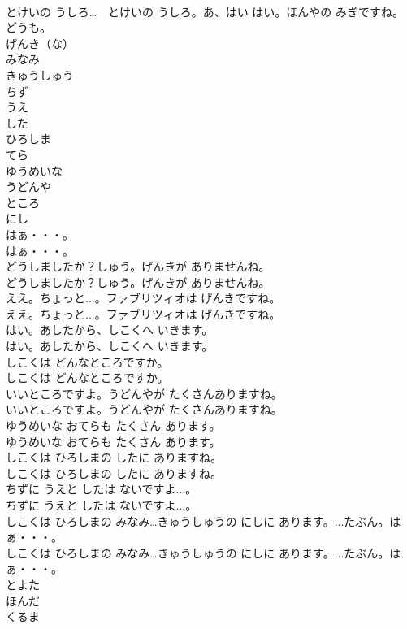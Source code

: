 \documentclass[8pt]{extreport}
\begin{document}
\begin{CJK}{UTF8}{min}
\\	とけいの うしろ…　とけいの うしろ。あ、はい はい。ほんやの みぎですね。どうも。 
\\	げんき（な）
\\	みなみ
\\	きゅうしゅう
\\	ちず
\\	うえ
\\	した
\\	ひろしま
\\	てら
\\	ゆうめいな
\\	うどんや
\\	ところ
\\	にし
\\	はぁ・・・。	
\\	はぁ・・・。 
\\	どうしましたか？しゅう。げんきが ありませんね。	
\\	どうしましたか？しゅう。げんきが ありませんね。 
\\	ええ。ちょっと...。ファブリツィオは げんきですね。	
\\	ええ。ちょっと...。ファブリツィオは げんきですね。 
\\	はい。あしたから、しこくへ いきます。	
\\	はい。あしたから、しこくへ いきます。 
\\	しこくは どんなところですか。	
\\	しこくは どんなところですか。 
\\	いいところですよ。うどんやが たくさんありますね。	
\\	いいところですよ。うどんやが たくさんありますね。 
\\	ゆうめいな おてらも たくさん あります。	
\\	ゆうめいな おてらも たくさん あります。 
\\	しこくは ひろしまの したに ありますね。	
\\	しこくは ひろしまの したに ありますね。 
\\	ちずに うえと したは ないですよ...。	
\\	ちずに うえと したは ないですよ...。 
\\	しこくは ひろしまの みなみ…きゅうしゅうの にしに あります。...たぶん。はぁ・・・。	
\\	しこくは ひろしまの みなみ…きゅうしゅうの にしに あります。...たぶん。はぁ・・・。 
\\	とよた
\\	ほんだ
\\	くるま

\end{CJK}
\end{document}
